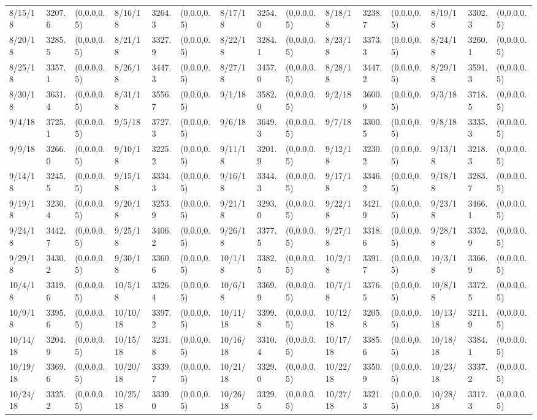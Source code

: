 \documentclass[12pt]{article}
\begin{document}
\begin{table}
\begin{center}
\begin{tabular}{p{15pt}p{15pt}p{25pt}p{15pt}p{15pt}p{25pt}p{15pt}p{15pt}p{25pt}p{15pt}p{15pt}p{25pt}p{15pt}p{15pt}p{25pt}}
        8/15/18&3207.6&(0,0.0,0.5)&8/16/18&3264.3&(0,0.0,0.5)&8/17/18&3254.0&(0,0.0,0.5)&8/18/18&3238.7&(0,0.0,0.5)&8/19/18&3302.3&(0,0.0,0.5)\\
        8/20/18&3285.5&(0,0.0,0.5)&8/21/18&3327.9&(0,0.0,0.5)&8/22/18&3284.1&(0,0.0,0.5)&8/23/18&3373.3&(0,0.0,0.5)&8/24/18&3260.1&(0,0.0,0.5)\\
        8/25/18&3357.1&(0,0.0,0.5)&8/26/18&3447.3&(0,0.0,0.5)&8/27/18&3457.0&(0,0.0,0.5)&8/28/18&3447.2&(0,0.0,0.5)&8/29/18&3591.3&(0,0.0,0.5)\\
        8/30/18&3631.4&(0,0.0,0.5)&8/31/18&3556.7&(0,0.0,0.5)&9/1/18&3582.0&(0,0.0,0.5)&9/2/18&3600.9&(0,0.0,0.5)&9/3/18&3718.5&(0,0.0,0.5)\\
        9/4/18&3725.1&(0,0.0,0.5)&9/5/18&3727.3&(0,0.0,0.5)&9/6/18&3649.3&(0,0.0,0.5)&9/7/18&3300.5&(0,0.0,0.5)&9/8/18&3335.3&(0,0.0,0.5)\\
        9/9/18&3266.0&(0,0.0,0.5)&9/10/18&3225.2&(0,0.0,0.5)&9/11/18&3201.9&(0,0.0,0.5)&9/12/18&3230.2&(0,0.0,0.5)&9/13/18&3218.3&(0,0.0,0.5)\\
        9/14/18&3245.5&(0,0.0,0.5)&9/15/18&3334.3&(0,0.0,0.5)&9/16/18&3344.3&(0,0.0,0.5)&9/17/18&3346.2&(0,0.0,0.5)&9/18/18&3283.7&(0,0.0,0.5)\\
        9/19/18&3230.4&(0,0.0,0.5)&9/20/18&3253.9&(0,0.0,0.5)&9/21/18&3293.0&(0,0.0,0.5)&9/22/18&3421.9&(0,0.0,0.5)&9/23/18&3466.1&(0,0.0,0.5)\\
        9/24/18&3442.7&(0,0.0,0.5)&9/25/18&3406.2&(0,0.0,0.5)&9/26/18&3377.5&(0,0.0,0.5)&9/27/18&3318.6&(0,0.0,0.5)&9/28/18&3352.9&(0,0.0,0.5)\\
        9/29/18&3430.2&(0,0.0,0.5)&9/30/18&3360.6&(0,0.0,0.5)&10/1/18&3382.5&(0,0.0,0.5)&10/2/18&3391.7&(0,0.0,0.5)&10/3/18&3366.9&(0,0.0,0.5)\\
        10/4/18&3319.6&(0,0.0,0.5)&10/5/18&3326.4&(0,0.0,0.5)&10/6/18&3369.9&(0,0.0,0.5)&10/7/18&3376.5&(0,0.0,0.5)&10/8/18&3372.5&(0,0.0,0.5)\\
        10/9/18&3395.6&(0,0.0,0.5)&10/10/18&3397.2&(0,0.0,0.5)&10/11/18&3399.8&(0,0.0,0.5)&10/12/18&3205.8&(0,0.0,0.5)&10/13/18&3211.9&(0,0.0,0.5)\\
        10/14/18&3204.9&(0,0.0,0.5)&10/15/18&3231.8&(0,0.0,0.5)&10/16/18&3310.4&(0,0.0,0.5)&10/17/18&3385.6&(0,0.0,0.5)&10/18/18&3384.1&(0,0.0,0.5)\\
        10/19/18&3369.6&(0,0.0,0.5)&10/20/18&3339.7&(0,0.0,0.5)&10/21/18&3329.0&(0,0.0,0.5)&10/22/18&3350.9&(0,0.0,0.5)&10/23/18&3337.2&(0,0.0,0.5)\\
        10/24/18&3325.2&(0,0.0,0.5)&10/25/18&3339.0&(0,0.0,0.5)&10/26/18&3329.5&(0,0.0,0.5)&10/27/18&3321.3&(0,0.0,0.5)&10/28/18&3317.3&(0,0.0,0.5)\\

\end{tabular}
\end{center}
\end{table}
\end{document}

